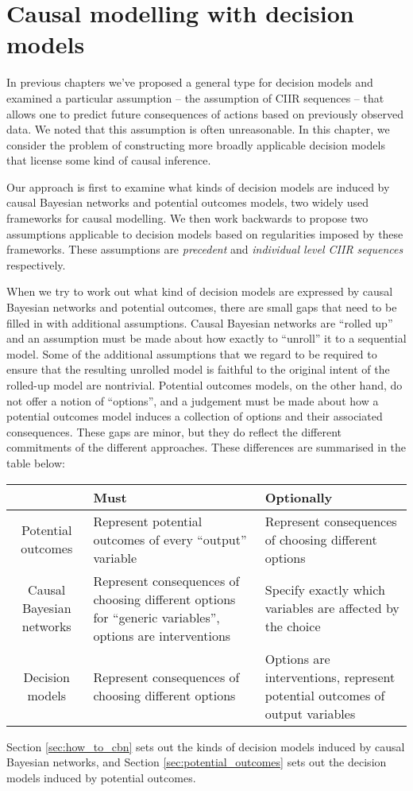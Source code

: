 
\chapter{Causal modelling with decision models}\label{ch:other_causal_frameworks}

In previous chapters we've proposed a general type for decision models and examined a particular assumption -- the assumption of CIIR sequences -- that allows one to predict future consequences of actions based on previously observed data. We noted that this assumption is often unreasonable. In this chapter, we consider the problem of constructing more broadly applicable decision models that license some kind of causal inference. 

Our approach is first to examine what kinds of decision models are induced by causal Bayesian networks and potential outcomes models, two widely used frameworks for causal modelling. We then work backwards to propose two assumptions applicable to decision models based on regularities imposed by these frameworks. These assumptions are \emph{precedent} and \emph{individual level CIIR sequences} respectively.

When we try to work out what kind of decision models are expressed by causal Bayesian networks and potential outcomes, there are small gaps that need to be filled in with additional assumptions. Causal Bayesian networks are ``rolled up'' and an assumption must be made about how exactly to ``unroll'' it to a sequential model. Some of the additional assumptions that we regard to be required to ensure that the resulting unrolled model is faithful to the original intent of the rolled-up model are nontrivial. Potential outcomes models, on the other hand, do not offer a notion of ``options'', and a judgement must be made about how a potential outcomes model induces a collection of options and their associated consequences. These gaps are minor, but they do reflect the different commitments of the different approaches. These differences are summarised in the table below:
\begin{center}
\begin{tabular}{ |c|p{5cm}|p{5cm}| } 
 \hline
  & Must & Optionally  \\
 \hline
 Potential outcomes & Represent potential outcomes of every ``output'' variable & Represent consequences of choosing different options \\ 
 Causal Bayesian networks & Represent consequences of choosing different options for ``generic variables'', options are interventions & Specify exactly which variables are affected by the choice \\
 Decision models & Represent consequences of choosing different options & Options are interventions, represent potential outcomes of output variables\\
 \hline
\end{tabular}
\end{center}
Section \ref{sec:how_to_cbn} sets out the kinds of decision models induced by causal Bayesian networks, and Section \ref{sec:potential_outcomes} sets out the decision models induced by potential outcomes.

